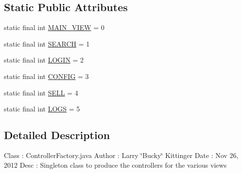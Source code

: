 \subsection*{Static Public Attributes}
\begin{DoxyCompactItemize}
\item 
static final int \hyperlink{classw3se_1_1_controller_1_1_controller_factory_a6a7ccd51a6578a23662085daf56dde92}{M\-A\-I\-N\-\_\-\-V\-I\-E\-W} = 0
\item 
static final int \hyperlink{classw3se_1_1_controller_1_1_controller_factory_a6b4f99f28f772b04d83cd840a52add01}{S\-E\-A\-R\-C\-H} = 1
\item 
static final int \hyperlink{classw3se_1_1_controller_1_1_controller_factory_ad5cd3960aaaed6a4a1c1e51f5ef0d9bf}{L\-O\-G\-I\-N} = 2
\item 
static final int \hyperlink{classw3se_1_1_controller_1_1_controller_factory_ae4a2c6a73c4e48952bbace51e7ab0c03}{C\-O\-N\-F\-I\-G} = 3
\item 
static final int \hyperlink{classw3se_1_1_controller_1_1_controller_factory_ab55317e2c56d181b48ad9928ec83aef4}{S\-E\-L\-L} = 4
\item 
static final int \hyperlink{classw3se_1_1_controller_1_1_controller_factory_ad1a630820e7935394c528353839b8380}{L\-O\-G\-S} = 5
\end{DoxyCompactItemize}


\subsection{Detailed Description}
Class \-: Controller\-Factory.\-java Author \-: Larry \char`\"{}\-Bucky\char`\"{} Kittinger Date \-: Nov 26, 2012 Desc \-: Singleton class to produce the controllers for the various views 

